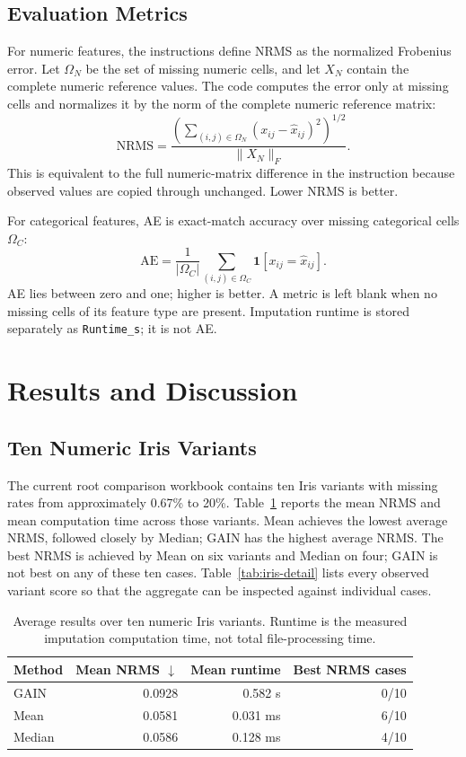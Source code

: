 \documentclass[11pt]{article}
\begin{document}
\subsection{Evaluation Metrics}
For numeric features, the instructions define NRMS as the normalized Frobenius error. Let $\Omega_N$ be the set of missing numeric cells, and let $X_N$ contain the complete numeric reference values. The code computes the error only at missing cells and normalizes it by the norm of the complete numeric reference matrix:
\[
\mathrm{NRMS}=\frac{\left(\sum_{(i,j)\in\Omega_N}(x_{ij}-\hat{x}_{ij})^2\right)^{1/2}}{\|X_N\|_F}.
\]
This is equivalent to the full numeric-matrix difference in the instruction because observed values are copied through unchanged. Lower NRMS is better.

For categorical features, AE is exact-match accuracy over missing categorical cells $\Omega_C$:
\[
\mathrm{AE}=\frac{1}{|\Omega_C|}\sum_{(i,j)\in\Omega_C}\mathbf{1}[x_{ij}=\hat{x}_{ij}].
\]
AE lies between zero and one; higher is better. A metric is left blank when no missing cells of its feature type are present. Imputation runtime is stored separately as \texttt{Runtime\_s}; it is not AE.

\section{Results and Discussion}
\subsection{Ten Numeric Iris Variants}
The current root comparison workbook contains ten Iris variants with missing rates from approximately 0.67\% to 20\%. Table~\ref{tab:iris} reports the mean NRMS and mean computation time across those variants. Mean achieves the lowest average NRMS, followed closely by Median; GAIN has the highest average NRMS. The best NRMS is achieved by Mean on six variants and Median on four; GAIN is not best on any of these ten cases. Table~\ref{tab:iris-detail} lists every observed variant score so that the aggregate can be inspected against individual cases.

\begin{table}[ht]
\centering
\small
\caption{Average results over ten numeric Iris variants. Runtime is the measured imputation computation time, not total file-processing time.}
\label{tab:iris}
\begin{tabular}{lrrr}
\toprule
Method & Mean NRMS $\downarrow$ & Mean runtime & Best NRMS cases \\
\midrule
GAIN   & 0.0928 & 0.582 s  & 0/10 \\
Mean   & 0.0581 & 0.031 ms & 6/10 \\
Median & 0.0586 & 0.128 ms & 4/10 \\
\bottomrule
\end{tabular}
\end{table}
\end{document}
